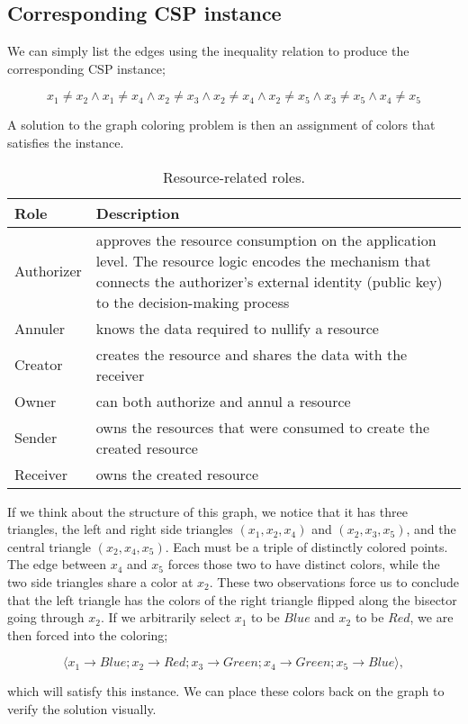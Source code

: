 \subsection{Corresponding CSP instance}

We can simply list the edges using the inequality relation to produce the corresponding CSP instance;

\begin{equation}
    x_1 \neq x_2 \wedge x_1 \neq x_4 \wedge x_2 \neq x_3 \wedge x_2 \neq x_4 \wedge x_2 \neq x_5 \wedge x_3 \neq x_5 \wedge x_4 \neq x_5
\end{equation}

A solution to the graph coloring problem is then an assignment of colors that satisfies the instance. 


\begin{table}[!h]
\begin{center}
\begin{tabular}{|p{1.5cm}|p{13cm}|}
\hline
 \textbf{Role} & \textbf{Description} \\ \hline
 Authorizer & approves the resource consumption on the application level. The resource logic encodes the mechanism that connects the authorizer's external identity (public key) to the decision-making process \\ \hline
 Annuler & knows the data required to nullify a resource
 \\ \hline
Creator & creates the resource and shares the data with the receiver
\\ \hline
Owner & can both authorize and annul a resource
\\ \hline
Sender & owns the resources that were consumed to create the created resource
\\ \hline
Receiver & owns the created resource
\\ \hline
\end{tabular}
\caption{Resource-related roles.}
\end{center}
\end{table}


If we think about the structure of this graph, we notice that it has three triangles, the left and right side triangles $(x_1, x_2, x_4)$  and $(x_2, x_3, x_5)$, and the central triangle $(x_2, x_4, x_5)$. Each must be a triple of distinctly colored points. The edge between $x_4$ and $x_5$ forces those two to have distinct colors, while the two side triangles share a color at $x_2$. These two observations force us to conclude that the left triangle has the colors of the right triangle flipped along the bisector going through $x_2$. If we arbitrarily select $x_1$ to be $\mathit{Blue}$ and $x_2$ to be $\mathit{Red}$, we are then forced into the coloring;

\begin{equation}
 \langle x_1 \rightarrow \mathit{Blue}; x_2 \rightarrow \mathit{Red}; x_3 \rightarrow \mathit{Green}; x_4 \rightarrow \mathit{Green}; x_5 \rightarrow \mathit{Blue}\rangle,
\end{equation}

which will satisfy this instance. We can place these colors back on the graph to verify the solution visually.
